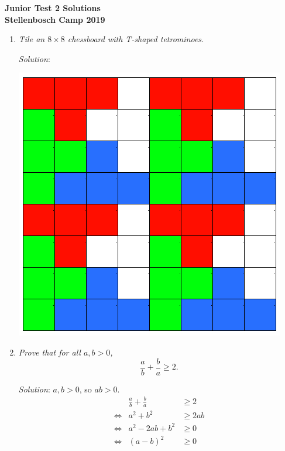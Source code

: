 \documentclass{article}
\begin{document}
\begin{center}
  \textbf{\Large Junior Test 2 Solutions}
  \\ \vspace{1em}
  \textbf{\large Stellenbosch Camp 2019}
\end{center}


\begin{enumerate}[1.]

\item %
\textit
{
    Tile an $8 \times 8$ chessboard with T-shaped tetrominoes.
}

\textit{Solution}: 
\begin{center}
    \includegraphics[scale=0.5]{tiling.png}
\end{center}

\item %
\textit{Prove that for all $a, b > 0$,
\[ \frac{a}{b} + \frac{b}{a} \geq 2. \]
}

\textit{Solution}:
$a, b > 0$, so $ab > 0$.
\begin{align*}
  &&\frac{a}{b} + \frac{b}{a} &\geq 2 \\
  &\iff& a^2 + b^2 &\geq 2ab \\
  &\iff& a^2 - 2ab + b^2 &\geq 0 \\
  &\iff& (a - b)^2 &\geq 0 & 
\end{align*}


\end{enumerate}
\end{document}

